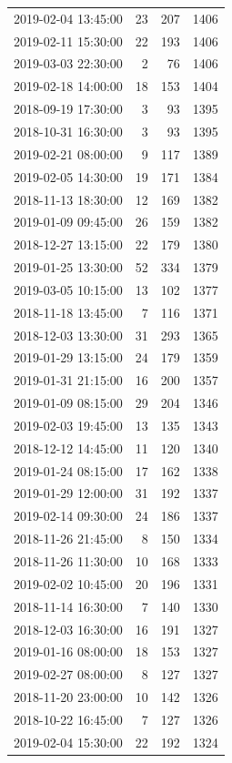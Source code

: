 \begin{tabular}{lrrr}
2019-02-04 13:45:00 & 23 & 207 & 1406 \\
2019-02-11 15:30:00 & 22 & 193 & 1406 \\
2019-03-03 22:30:00 & 2 & 76 & 1406 \\
2019-02-18 14:00:00 & 18 & 153 & 1404 \\
2018-09-19 17:30:00 & 3 & 93 & 1395 \\
2018-10-31 16:30:00 & 3 & 93 & 1395 \\
2019-02-21 08:00:00 & 9 & 117 & 1389 \\
2019-02-05 14:30:00 & 19 & 171 & 1384 \\
2018-11-13 18:30:00 & 12 & 169 & 1382 \\
2019-01-09 09:45:00 & 26 & 159 & 1382 \\
2018-12-27 13:15:00 & 22 & 179 & 1380 \\
2019-01-25 13:30:00 & 52 & 334 & 1379 \\
2019-03-05 10:15:00 & 13 & 102 & 1377 \\
2018-11-18 13:45:00 & 7 & 116 & 1371 \\
2018-12-03 13:30:00 & 31 & 293 & 1365 \\
2019-01-29 13:15:00 & 24 & 179 & 1359 \\
2019-01-31 21:15:00 & 16 & 200 & 1357 \\
2019-01-09 08:15:00 & 29 & 204 & 1346 \\
2019-02-03 19:45:00 & 13 & 135 & 1343 \\
2018-12-12 14:45:00 & 11 & 120 & 1340 \\
2019-01-24 08:15:00 & 17 & 162 & 1338 \\
2019-01-29 12:00:00 & 31 & 192 & 1337 \\
2019-02-14 09:30:00 & 24 & 186 & 1337 \\
2018-11-26 21:45:00 & 8 & 150 & 1334 \\
2018-11-26 11:30:00 & 10 & 168 & 1333 \\
2019-02-02 10:45:00 & 20 & 196 & 1331 \\
2018-11-14 16:30:00 & 7 & 140 & 1330 \\
2018-12-03 16:30:00 & 16 & 191 & 1327 \\
2019-01-16 08:00:00 & 18 & 153 & 1327 \\
2019-02-27 08:00:00 & 8 & 127 & 1327 \\
2018-11-20 23:00:00 & 10 & 142 & 1326 \\
2018-10-22 16:45:00 & 7 & 127 & 1326 \\
2019-02-04 15:30:00 & 22 & 192 & 1324 \\

\end{tabular}
